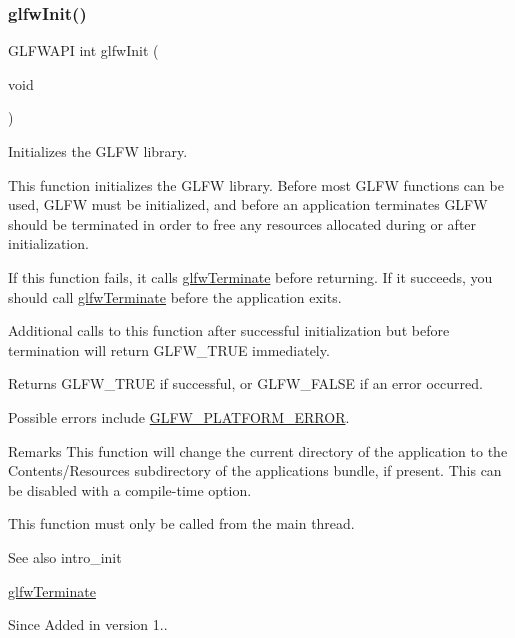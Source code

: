 \subsubsection{\texorpdfstring{glfw\+Init()}{glfwInit()}}
{\footnotesize\ttfamily G\+L\+F\+W\+A\+PI int glfw\+Init (\begin{DoxyParamCaption}\item[{void}]{ }\end{DoxyParamCaption})}



Initializes the G\+L\+FW library. 

This function initializes the G\+L\+FW library. Before most G\+L\+FW functions can be used, G\+L\+FW must be initialized, and before an application terminates G\+L\+FW should be terminated in order to free any resources allocated during or after initialization.

If this function fails, it calls \hyperlink{group__init_gafd90e6fd4819ea9e22e5e739519a6504}{glfw\+Terminate} before returning. If it succeeds, you should call \hyperlink{group__init_gafd90e6fd4819ea9e22e5e739519a6504}{glfw\+Terminate} before the application exits.

Additional calls to this function after successful initialization but before termination will return {\ttfamily G\+L\+F\+W\+\_\+\+T\+R\+UE} immediately.

\begin{DoxyReturn}{Returns}
{\ttfamily G\+L\+F\+W\+\_\+\+T\+R\+UE} if successful, or {\ttfamily G\+L\+F\+W\+\_\+\+F\+A\+L\+SE} if an error occurred.
\end{DoxyReturn}
Possible errors include \hyperlink{group__errors_gad44162d78100ea5e87cdd38426b8c7a1}{G\+L\+F\+W\+\_\+\+P\+L\+A\+T\+F\+O\+R\+M\+\_\+\+E\+R\+R\+OR}.

\begin{DoxyRemark}{Remarks}
This function will change the current directory of the application to the {\ttfamily Contents/\+Resources} subdirectory of the application\textquotesingle{}s bundle, if present. This can be disabled with a compile-\/time option.
\end{DoxyRemark}
This function must only be called from the main thread.

\begin{DoxySeeAlso}{See also}
intro\+\_\+init 

\hyperlink{group__init_gafd90e6fd4819ea9e22e5e739519a6504}{glfw\+Terminate}
\end{DoxySeeAlso}
\begin{DoxySince}{Since}
Added in version 1.. 
\end{DoxySince}
\mbox{\label{group__init_ga5919096b958c47102126061fb5a6f9c3}} 
